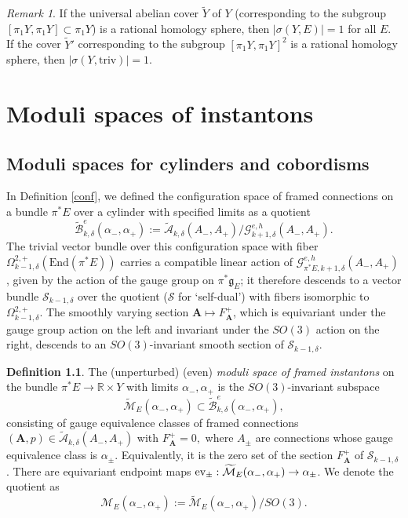 \documentclass{memo-l}
\newcommand{\pE}{\pi^* \! E}
\theoremstyle{definition}
\newtheorem{definition}[theorem]{Definition}
\theoremstyle{remark}
\newtheorem{remark}[theorem]{Remark}
\numberwithin{section}{chapter}
\numberwithin{equation}{chapter}
\begin{document}
\begin{remark}If the universal abelian cover $\tilde Y$ of $Y$ (corresponding to the subgroup $[\pi_1 Y, \pi_1 Y] \subset \pi_1 Y$) is a rational homology sphere, then $|\sigma(Y, E)| = 1$ for all $E$. If the cover $\tilde Y'$ corresponding to the subgroup $[\pi_1 Y, \pi_1 Y]^2$ is a rational homology sphere, then $|\sigma(Y, \text{triv})| = 1$. 
\end{remark}
\chapter{Moduli spaces of instantons}\label{chap:4}
\section{Moduli spaces for cylinders and cobordisms}\label{sec:4d-moduli}
In Definition \ref{conf}, we defined the configuration space of framed connections on a bundle $\pE$ over a cylinder with specified limits as a quotient $$\widetilde{\mathcal B}^e_{k,\delta}(\alpha_-, \alpha_+) := \widetilde{\mathcal A}_{k,\delta}(A_-, A_+)\big/ \mathcal G_{k+1,\delta}^{e, h}(A_-, A_+).$$ The trivial vector bundle over this configuration space with fiber $\Omega^{2,+}_{k-1,\delta}(\text{End}(\pE))$ carries a compatible linear action of $\mathcal G_{\pE,k+1,\delta}^{e,h}(A_-, A_+)$, given by the action of the gauge group on $\pi^* \! \mathfrak g_E$; it therefore descends to a vector bundle $\mathcal S_{k-1,\delta}$ over the quotient ($\mathcal S$ for `self-dual') with fibers isomorphic to $\Omega^{2,+}_{k-1,\delta}$. The smoothly varying section $\mathbf{A} \mapsto F_{\mathbf{A}}^+$, which is equivariant under the gauge group action on the left and invariant under the $SO(3)$ action on the right, descends to an $SO(3)$-invariant smooth section of $\mathcal S_{k-1,\delta}$. 

\begin{definition}\label{moduli}The (unperturbed) (even) \emph{moduli space of framed instantons} on the bundle $\pE \to \mathbb R \times Y$ with limits $\alpha_-, \alpha_+$ is the $SO(3)$-invariant subspace 
$$\widetilde{\mathcal M}_E(\alpha_-, \alpha_+) \subset \widetilde{\mathcal B}^e_{k,\delta}(\alpha_-, \alpha_+),$$ 
consisting of gauge equivalence classes of framed connections $(\textbf{A},p) \in \widetilde{\mathcal A}_{k,\delta}(A_-, A_+)$ with $F_{\textbf{A}}^+ = 0,$ where $A_\pm$ are connections whose gauge equivalence class is $\alpha_\pm$. Equivalently, it is the zero set of the section $F_{\mathbf{A}}^+$ of $\mathcal S_{k-1,\delta}$. There are equivariant endpoint maps $\textup{ev}_{\pm}: \widetilde{\mathcal M}_E(\alpha_-, \alpha_+) \to \alpha_\pm$. We denote the quotient as $$\mathcal M_E(\alpha_-, \alpha_+) := \widetilde{\mathcal M}_E(\alpha_-, \alpha_+)\big/SO(3).$$
\end{definition}
\end{document}
